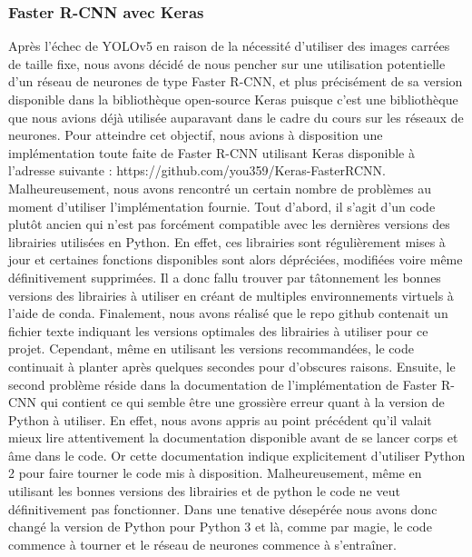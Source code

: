 \subsubsection{Faster R-CNN avec Keras}
Après l'échec de YOLOv5 en raison de la nécessité d'utiliser des images carrées de taille fixe, nous avons décidé de nous pencher sur une utilisation potentielle d'un réseau de neurones de type Faster R-CNN, et plus précisément de sa version disponible dans la bibliothèque open-source Keras puisque c'est une bibliothèque que nous avions déjà utilisée auparavant dans le cadre du cours sur les réseaux de neurones. Pour atteindre cet objectif, nous avions à disposition une implémentation toute faite de Faster R-CNN utilisant Keras disponible à l'adresse suivante : https://github.com/you359/Keras-FasterRCNN. Malheureusement, nous avons rencontré un certain nombre de problèmes au moment d'utiliser l'implémentation fournie.
Tout d'abord, il s'agit d'un code plutôt ancien qui n'est pas forcément compatible avec les dernières versions des librairies utilisées en Python. En effet, ces librairies sont régulièrement mises à jour et certaines fonctions disponibles sont alors dépréciées, modifiées voire même définitivement supprimées. Il a donc fallu trouver par tâtonnement les bonnes versions des librairies à utiliser en créant de multiples environnements virtuels à l'aide de conda. Finalement, nous avons réalisé que le repo github contenait un fichier texte indiquant les versions optimales des librairies à utiliser pour ce projet. Cependant, même en utilisant les versions recommandées, le code continuait à planter après quelques secondes pour d'obscures raisons.
Ensuite, le second problème réside dans la documentation de l'implémentation de Faster R-CNN qui contient ce qui semble être une grossière erreur quant à la version de Python à utiliser. En effet, nous avons appris au point précédent qu'il valait mieux lire attentivement la documentation disponible avant de se lancer corps et âme dans le code. Or cette documentation indique explicitement d'utiliser Python 2 pour faire tourner le code mis à disposition. Malheureusement, même en utilisant les bonnes versions des librairies et de python le code ne veut définitivement pas fonctionner. Dans une tenative désepérée nous avons donc changé la version de Python pour Python 3 et là, comme par magie, le code commence à tourner et le réseau de neurones commence à s'entraîner.
